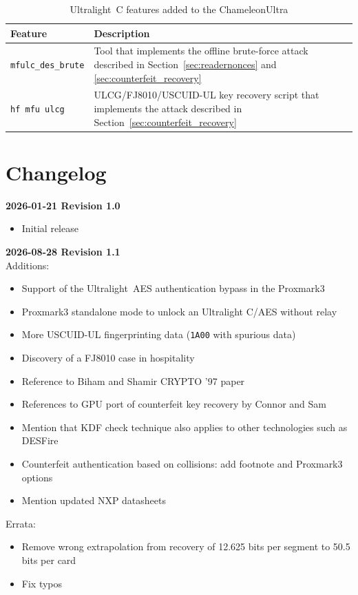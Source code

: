 \documentclass[10pt,letterpaper]{article}
\begin{document}
\begin{table}[ht]
  \centering
  \caption{Ultralight~C features added to the ChameleonUltra}
  \label{tab:cu-ulc-features}
  \begin{tabular}{|l|p{}|}
    \hline
    \textbf{Feature} & \textbf{Description} \\ \hline
    {\small \texttt{mfulc\_des\_brute}} & Tool that implements the offline brute-force attack described in Section~\ref{sec:readernonces} and \ref{sec:counterfeit_recovery} \\ \hline
    {\small \texttt{hf mfu ulcg}} & ULCG/FJ8010/USCUID-UL key recovery script that implements the attack described in Section~\ref{sec:counterfeit_recovery} \\ \hline
  \end{tabular}
\end{table}

\section{Changelog}
\label{app:changelog}

\noindent\textbf{2026-01-21 Revision 1.0}
\begin{itemize}
    \item Initial release
\end{itemize}

\noindent\textbf{2026-08-28 Revision 1.1}\\
Additions:
\begin{itemize}
    \item Support of the Ultralight~AES authentication bypass in the Proxmark3
    \item Proxmark3 standalone mode to unlock an Ultralight C/AES without relay
    \item More USCUID-UL fingerprinting data (\texttt{1A00} with spurious data)
    \item Discovery of a FJ8010 case in hospitality
    \item Reference to Biham and Shamir CRYPTO '97 paper
    \item References to GPU port of counterfeit key recovery by Connor and Sam
    \item Mention that KDF check technique also applies to other technologies such as DESFire
    \item Counterfeit authentication based on collisions: add footnote and Proxmark3 options
    \item Mention updated NXP datasheets
\end{itemize}
Errata:
\begin{itemize}
    \item Remove wrong extrapolation from recovery of 12.625 bits per segment to  50.5 bits per card
    \item Fix typos
\end{itemize}
\end{document}
